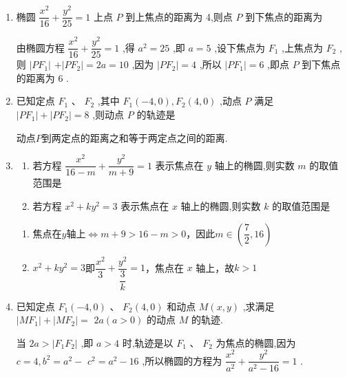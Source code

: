 \begin{enumerate}
    \item 椭圆 $\dfrac{{x}^{2}}{16} + \dfrac{{y}^{2}}{25} = 1$ 上点 $P$ 到上焦点的距离为 4,则点 $P$ 到下焦点的距离为
    \begin{jieda}
        由椭圆方程 $\dfrac{{x}^{2}}{16} + \dfrac{{y}^{2}}{25} = 1$ ,得 ${a}^{2} = {25}$ ,即 $a = 5$ ,设下焦点为 ${F}_{1}$ ,上焦点为 ${F}_{2}$ ,则 $\left| {P{F}_{1}}\right|$  $+ \left| {P{F}_{2}}\right|  = {2a} = {10}$ ,因为 $\left| {P{F}_{2}}\right|  = 4$ ,所以 $\left| {P{F}_{1}}\right|  = 6$ ,即点 $P$ 到下焦点的距离为 6 .
    \end{jieda}
    \item 已知定点 ${F}_{1}\text{ 、 }{F}_{2}$ ,其中 ${F}_{1}\left( {-4,0}\right) ,{F}_{2}\left( {4,0}\right)$ ,动点 $P$ 满足 $\left| {P{F}_{1}}\right|  + \left| {P{F}_{2}}\right|  = 8$ ,则动点 $P$ 的轨迹是
    \begin{jieda}
        动点$P$到两定点的距离之和等于两定点之间的距离.
    \end{jieda}

    \item
    \begin{enumerate}
        \item 若方程 $\dfrac{{x}^{2}}{{16} - m} + \dfrac{{y}^{2}}{m + 9} = 1$ 表示焦点在 $y$ 轴上的椭圆,则实数 $m$ 的取值范围是
        \item 若方程 ${x}^{2} + k{y}^{2} = 3$ 表示焦点在 $x$ 轴上的椭圆,则实数 $k$ 的取值范围是
    \end{enumerate}
    \begin{jieda}
        \begin{enumerate}
            \item 焦点在$y$轴上$\Longleftrightarrow m+9 > 16-m > 0$，因此$m \in \left(\dfrac{7}{2}, 16\right)$
            \item ${x}^{2} + k{y}^{2} = 3$即$\dfrac{x^2}{3} + \dfrac{y^2}{\dfrac{3}{k}} = 1$，焦点在 $x$ 轴上，故$k>1$
        \end{enumerate}
    \end{jieda}
    \item 已知定点 ${F}_{1}\left( {-4,0}\right) \text{ 、 }{F}_{2}\left( {4,0}\right)$ 和动点 $M\left( {x,y}\right)$ ,求满足 $\left| {M{F}_{1}}\right|  + \left| {M{F}_{2}}\right|  =$  ${2a}\left( {a > 0}\right)$ 的动点 $M$ 的轨迹.
    \begin{jieda}
        当 ${2a} > \left| {{F}_{1}{F}_{2}}\right|$ ,即 $a > 4$ 时,轨迹是以 ${F}_{1}\text{ 、 }{F}_{2}$ 为焦点的椭圆,因为 $c = 4,{b}^{2} = {a}^{2} -$  ${c}^{2} = {a}^{2} - {16}$ ,所以椭圆的方程为 $\dfrac{{x}^{2}}{{a}^{2}} + \dfrac{{y}^{2}}{{a}^{2} - {16}} = 1$ .
        

\end{jieda}
\end{enumerate}
